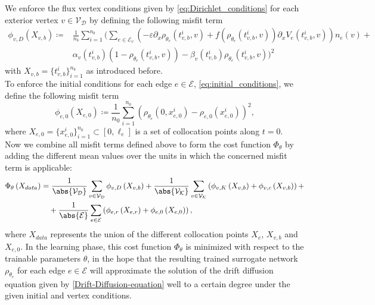 We enforce the flux vertex conditions given by \cref{eq:Dirichlet_conditions} for each exterior vertex $v \in \mathcal{V}_\mathcal{D}$ by defining the following misfit term  
\begin{equation}
    \label{misfit:Dirichlet}
    \begin{aligned} 
        \phi_{v,D}  \left( X_{v,b} \right) \coloneqq & \frac{1}{n_b} \sum_{i=1}^{n_b} \bigg( \sum_{e \in \mathcal{E}_v} \left(- \varepsilon \partial_x \rho_{\theta_e}  \left( t_{v,b}^i, v \right) + f\left(\rho_{\theta_e}  \left( t_{v,b}^i, v \right)\right) \partial_x V_e\left( t_{v,b}^i, v \right) \right) n_e  \left( v \right) + \\
        & \alpha_v \left( t_{v,b}^i \right)  \left( 1- \rho_{\theta_e}  \left( t_{v,b}^i, v \right) \right) - \beta_v \left( t_{v,b}^i \right) \rho_{\theta_e}  \left( t_{v,b}^i, v \right) \bigg)^2
    \end{aligned}
\end{equation}
with $X_{v,b} = \{t_{v,b}^i\}_{i=1}^{n_b}$ as introduced before. \\
To enforce the initial conditions for each edge $e \in \mathcal{E}$, \cref{eq:initial_conditions}, we define the following misfit term  
\begin{equation} 
    \label{misfit:initial}
    \phi_{e,0}  \left( X_{e,0} \right) \coloneqq \frac{1}{n_0} \sum_{i=1}^{n_0}  \left( \rho_{\theta_e}  \left( 0,x_{e,0}^i \right) - \rho_{e,0} \left( x_{e,0}^i \right) \right)^2, 
\end{equation} 
where $X_{e,0} = \{x_{e,0}^i\}_{i=1}^{n_0} \subset [0, \ell_e]$ is a set of collocation points along $t=0$. \\ 
Now we combine all misfit terms defined above to form the cost function $\Phi_\theta$ by adding the different mean values over the units in which the concerned misfit term is applicable: 
\begin{equation}
    \label{eq:loss:1}
    \begin{aligned} 
        \Phi_{\theta} \left( X_{data} \right) & =  \frac{1}{\abs{\mathcal{V}_\mathcal{D}}} \sum_{v \in \mathcal{V}_\mathcal{D}} \phi_{v,D} \left( X_{v,b} \right) + \frac{1}{\abs{\mathcal{V}_\mathcal{K}}} \sum_{v \in \mathcal{V}_\mathcal{K}}  \left(  \phi_{v,K}  \left( X_{v,b} \right) + \phi_{v,c} \left( X_{v,b} \right)  \right) + \\
        & \quad + \frac{1}{\abs{\mathcal{E}}} \sum_{e \in \mathcal{E}}  \left(  \phi_{e,r}  \left( X_{e,r} \right) + \phi_{e,0}  \left( X_{e,0} \right)  \right), 
    \end{aligned}
\end{equation}
where $X_{data}$ represents the union of the different collocation points $X_e$, $X_{v,b}$ and $X_{e,0}$. In the learning phase, this cost function $\Phi_{\theta}$ is minimized with respect to the trainable parameters $\theta$, in the hope that the resulting trained surrogate network $\rho_{\theta_e}$ for each edge $e \in \mathcal{E}$ will approximate the solution of the drift diffusion equation given by \cref{Drift-Diffusion-equation} well to a certain degree under the given initial and vertex conditions. 


